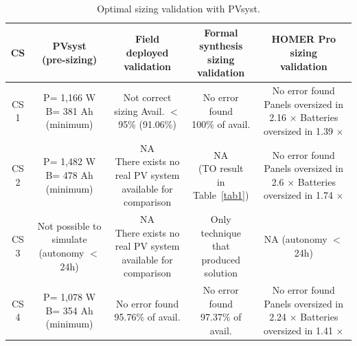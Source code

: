 \documentclass[runningheads]{llncs}
\begin{document}
\begin{table}
\caption{Optimal sizing validation with PVsyst.}
\label{tab2}
\begin{scriptsize}
\begin{tabular}{c|c|c|c|c}
\hline
\hline
CS & \makecell{PVsyst\\(pre-sizing)}& \makecell{Field\\deployed\\validation}& \makecell{Formal synthesis\\sizing\\validation}& \makecell{HOMER Pro\\sizing\\validation}\\
\hline
\hline
CS 1 & \makecell{P= 1,166 W\\B= 381 Ah\\(minimum)} & \makecell{Not correct sizing \\Avail. $<$ 95\%\\(91.06\%)} & \makecell{No error found \\100\% of avail.} & \makecell{No error found\\Panels oversized in 2.16 $\times$\\Batteries oversized in 1.39 $\times$}\\
\hline
CS 2 & \makecell{P= 1,482 W\\B= 478 Ah\\(minimum)} & \makecell{NA\\There exists no real PV system\\available for comparison} & \makecell{NA \\(TO result\\in Table~\ref{tab1})} & \makecell{No error found\\Panels oversized in 2.6 $\times$\\Batteries oversized in 1.74 $\times$}\\
\hline
CS 3 & \makecell{Not possible to \\simulate\\(autonomy $<$ 24h)} & \makecell{NA\\There exists no real PV system\\available for comparison} & \makecell{Only technique that\\produced solution} & \makecell{NA\\(autonomy $<$ 24h)}\\
\hline
CS 4 & \makecell{P= 1,078 W\\B= 354 Ah\\(minimum)} & \makecell{No error found \\95.76\% of avail.} & \makecell{No error found \\97.37\% of avail.} & \makecell{No error found\\Panels oversized in 2.24 $\times$\\Batteries oversized in 1.41 $\times$}\\

\end{tabular}
\end{scriptsize}
\end{table}
\end{document}

